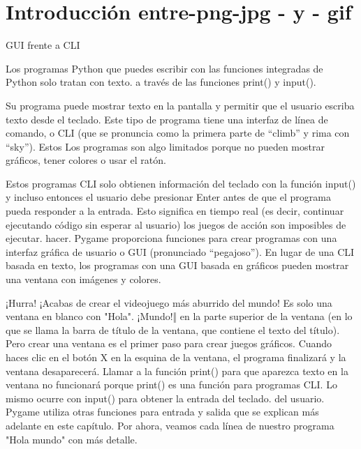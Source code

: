 




\chapter{Introducción entre-png-jpg - y -  gif} %






GUI frente a CLI

Los programas Python que puedes escribir con las funciones integradas de Python solo tratan con texto.
a través de las funciones print() y input(). 

Su programa puede mostrar texto en la pantalla y permitir que el usuario escriba texto desde el teclado.
Este tipo de programa tiene una interfaz de línea de comando, o CLI (que se pronuncia como la primera
parte de “climb” y rima con “sky”). Estos Los programas son algo limitados porque no pueden mostrar gráficos, 
tener colores o usar el ratón. 

Estos programas CLI solo obtienen información del teclado con la función input() y
incluso entonces el usuario debe presionar Enter antes de que el programa pueda responder a la entrada. Esto significa en tiempo real
(es decir, continuar ejecutando código sin esperar al usuario) los juegos de acción son imposibles de ejecutar.
hacer. Pygame proporciona funciones para crear programas con una interfaz gráfica de usuario o GUI
(pronunciado “pegajoso”). En lugar de una CLI basada en texto, los programas con una GUI basada en gráficos pueden
mostrar una ventana con imágenes y colores.


¡Hurra! ¡Acabas de crear el videojuego más aburrido del mundo! Es solo una ventana en blanco con "Hola".
¡Mundo!‖ en la parte superior de la ventana (en lo que se llama la barra de título de la ventana, que contiene el
texto del título). Pero crear una ventana es el primer paso para crear juegos gráficos. Cuando haces clic
en el botón X en la esquina de la ventana, el programa finalizará y la ventana desaparecerá.
Llamar a la función print() para que aparezca texto en la ventana no funcionará porque
print() es una función para programas CLI. Lo mismo ocurre con input() para obtener la entrada del teclado.
del usuario. Pygame utiliza otras funciones para entrada y salida que se explican más adelante en este
capítulo. Por ahora, veamos cada línea de nuestro programa "Hola mundo" con más detalle.




